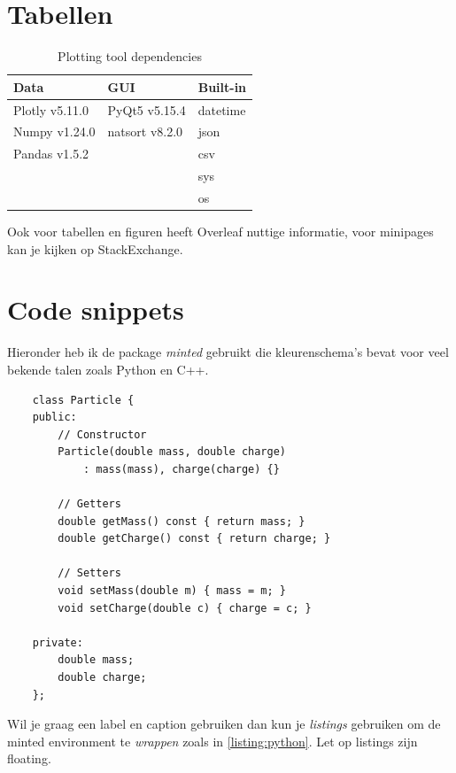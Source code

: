 \documentclass{article}
\begin{document}
\section{Tabellen}

\begin{table}[H]
\centering
\caption{Plotting tool dependencies}
\label{tab:dependencies}
\begin{tabular}{l|l|l}
\rowcolor[HTML]{EFEFEF} 
Data & GUI & Built-in \\ \hline\hline
Plotly v5.11.0 & PyQt5 v5.15.4 & datetime \\ 
Numpy v1.24.0 & natsort v8.2.0 & json \\ 
Pandas v1.5.2 &  & csv \\ 
 &  & sys \\ 
 &  & os \\ 
\end{tabular}
\end{table}
Ook voor tabellen en figuren heeft Overleaf nuttige informatie\cite{OverleafFigures}, voor minipages kan je kijken op StackExchange\cite{StackExchangeMinipage}.

\section{Code snippets}
Hieronder heb ik de package \textit{minted} gebruikt die kleurenschema's bevat voor veel bekende talen zoals Python en C++.
\begin{verbatim}
    class Particle {
    public:
        // Constructor
        Particle(double mass, double charge) 
            : mass(mass), charge(charge) {}
    
        // Getters
        double getMass() const { return mass; }
        double getCharge() const { return charge; }
    
        // Setters
        void setMass(double m) { mass = m; }
        void setCharge(double c) { charge = c; }
    
    private:
        double mass;
        double charge;
    };
\end{verbatim}
Wil je graag een label en caption gebruiken dan kun je \textit{listings} gebruiken om de minted environment te \textit{wrappen} zoals in \cref{listing:python}.
Let op listings zijn floating.
\end{document}
